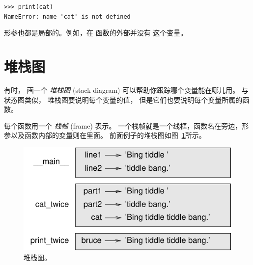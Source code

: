 \begin{lstlisting}
>>> print(cat)
NameError: name 'cat' is not defined
\end{lstlisting}

%

形参也都是局部的。例如，在  函数的外部并没有  这个变量。


%
\section{堆栈图}
\label{stackdiagram}
    
    


有时， 画一个 {\em 堆栈图} (stack diagram) 可以帮助你跟踪哪个变量能在哪儿用。  
与状态图类似， 堆栈图要说明每个变量的值， 但是它们也要说明每个变量所属的函数。  
  


每个函数用一个 {\em 栈帧} (frame) 表示。
一个栈帧就是一个线框，函数名在旁边，形参以及函数内部的变量则在里面。
前面例子的堆栈图如图~\ref{fig.stack}所示。

\begin{figure}
\centerline
{\includegraphics[scale=0.8]{../source/figs/stack.pdf}}
\caption{堆栈图。}
\label{fig.stack}
\end{figure}

